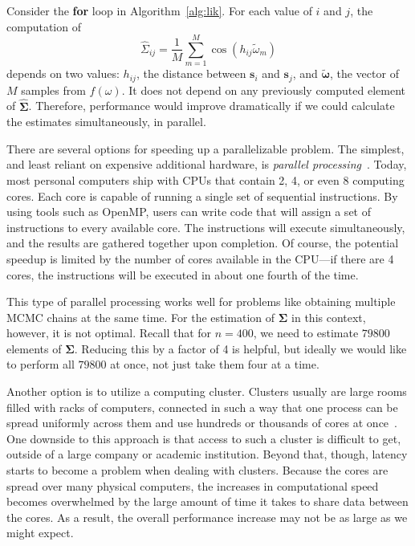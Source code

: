 \documentclass[12pt]{article}
\begin{document}
Consider the \textbf{for} loop in Algorithm~\ref{alg:lik}. For each value of $i$ and $j$, the computation of
\[
  \widehat{\Sigma}_{ij} = \frac{1}{M} \sum_{m=1}^M \cos(h_{ij} \widetilde{\omega}_m)
\]
depends on two values: $h_{ij}$, the distance between $\bm{s}_i$ and $\bm{s}_j$, and $\widetilde{\bm{\omega}}$, the vector of $M$ samples from $f(\omega)$. It does not depend on any previously computed element of $\widehat{\bm{\Sigma}}$. Therefore, performance would improve dramatically if we could calculate the estimates simultaneously, in parallel.

There are several options for speeding up a parallelizable problem. The simplest, and least reliant on expensive additional hardware, is \emph{parallel processing}~\cite{suchard2010understanding}. Today, most personal computers ship with CPUs that contain 2, 4, or even 8 computing cores. Each core is capable of running a single set of sequential instructions. By using tools such as OpenMP, users can write code that will assign a set of instructions to every available core. The instructions will execute simultaneously, and the results are gathered together upon completion. Of course, the potential speedup is limited by the number of cores available in the CPU---if there are 4 cores, the instructions will be executed in about one fourth of the time.

This type of parallel processing works well for problems like obtaining multiple MCMC chains at the same time. For the estimation of $\bm{\Sigma}$ in this context, however, it is not optimal. Recall that for $n = 400$, we need to estimate $79800$ elements of $\bm{\Sigma}$. Reducing this by a factor of 4 is helpful, but ideally we would like to perform all $79800$ at once, not just take them four at a time.

Another option is to utilize a computing cluster. Clusters usually are large rooms filled with racks of computers, connected in such a way that one process can be spread uniformly across them and use hundreds or thousands of cores at once~\cite{suchard2010understanding}. One downside to this approach is that access to such a cluster is difficult to get, outside of a large company or academic institution. Beyond that, though, latency starts to become a problem when dealing with clusters. Because the cores are spread over many physical computers, the increases in computational speed becomes overwhelmed by the large amount of time it takes to share data between the cores. As a result, the overall performance increase may not be as large as we might expect.
\end{document}
